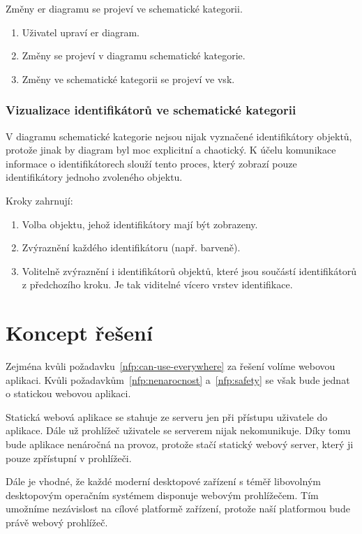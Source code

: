 Změny \acrshort{er} diagramu se projeví ve schematické kategorii.

\begin{enumerate}
  \item Uživatel upraví \acrshort{er} diagram.
  \item Změny se projeví v diagramu schematické kategorie.
  \item Změny ve schematické kategorii se projeví ve \acrshort{vsk}.
\end{enumerate}

\subsubsection*{Vizualizace identifikátorů ve schematické kategorii}
V diagramu schematické kategorie nejsou nijak vyznačené identifikátory objektů, protože jinak by diagram byl moc explicitní a chaotický.
K účelu komunikace informace o identifikátorech slouží tento proces, který zobrazí pouze identifikátory jednoho zvoleného objektu.

Kroky zahrnují:
\begin{enumerate}
  \item Volba objektu, jehož identifikátory mají být zobrazeny.
  \item Zvýraznění každého identifikátoru (např. barveně).
  \item Volitelně zvýraznění i identifikátorů objektů, které jsou součástí identifikátorů z předchozího kroku.
        Je tak viditelné vícero vrstev identifikace.
\end{enumerate}

\section{Koncept řešení}

Zejména kvůli požadavku~\ref{nfp:can-use-everywhere} za řešení volíme webovou aplikaci.
Kvůli požadavkům~\ref{nfp:nenarocnost} a~\ref{nfp:safety} se však bude jednat o statickou webovou aplikaci.

Statická webová aplikace se stahuje ze serveru jen při přístupu uživatele do aplikace.
Dále už prohlížeč uživatele se serverem nijak nekomunikuje.
Díky tomu bude aplikace nenáročná na provoz, protože stačí statický webový server, který ji pouze zpřístupní v prohlížeči.

Dále je vhodné, že každé moderní desktopové zařízení s téměř libovolným desktopovým operačním systémem disponuje webovým prohlížečem.
Tím umožníme nezávislost na cílové platformě zařízení, protože naší platformou bude právě webový prohlížeč.

